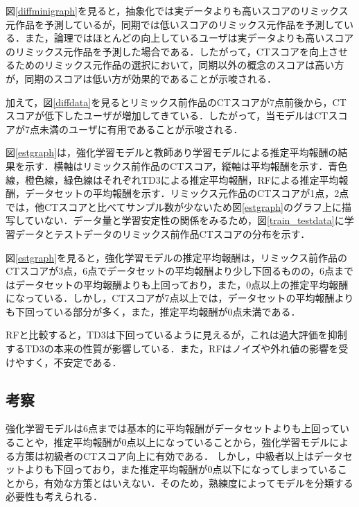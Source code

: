 \documentclass[submit,techrep,noauthor]{ipsj}
\begin{document}
図\ref{diffminigraph}を見ると，抽象化では実データよりも高いスコアのリミックス元作品を予測しているが，同期では低いスコアのリミックス元作品を予測している．また，論理ではほとんどの向上しているユーザは実データよりも高いスコアのリミックス元作品を予測した場合である．したがって，CTスコアを向上させるためのリミックス元作品の選択において，同期以外の概念のスコアは高い方が，同期のスコアは低い方が効果的であることが示唆される．

加えて，図\ref{diffdata}を見るとリミックス前作品のCTスコアが7点前後から，CTスコアが低下したユーザが増加してきている．したがって，当モデルはCTスコアが7点未満のユーザに有用であることが示唆される．

図\ref{estgraph}は，強化学習モデルと教師あり学習モデルによる推定平均報酬の結果を示す．横軸はリミックス前作品のCTスコア，縦軸は平均報酬を示す．青色線，橙色線，緑色線はそれぞれTD3による推定平均報酬，RFによる推定平均報酬，データセットの平均報酬を示す．リミックス元作品のCTスコアが1点，2点では，他CTスコアと比べてサンプル数が少ないため図\ref{estgraph}のグラフ上に描写していない．データ量と学習安定性の関係をみるため，図\ref{train_testdata}に学習データとテストデータのリミックス前作品CTスコアの分布を示す．


図\ref{estgraph}を見ると，強化学習モデルの推定平均報酬は，リミックス前作品のCTスコアが3点，6点でデータセットの平均報酬より少し下回るものの，6点まではデータセットの平均報酬よりも上回っており，また，0点以上の推定平均報酬になっている．しかし，CTスコアが7点以上では，データセットの平均報酬よりも下回っている部分が多く，また，推定平均報酬が0点未満である．

RFと比較すると，TD3は下回っているように見えるが，これは過大評価を抑制するTD3の本来の性質が影響している．また，RFはノイズや外れ値の影響を受けやすく，不安定である．

\subsection{考察}
強化学習モデルは6点までは基本的に平均報酬がデータセットよりも上回っていることや，推定平均報酬が0点以上になっていることから，強化学習モデルによる方策は初級者のCTスコア向上に有効である．
しかし，中級者以上はデータセットよりも下回っており，また推定平均報酬が0点以下になってしまっていることから，有効な方策とはいえない．そのため，熟練度によってモデルを分類する必要性も考えられる．
\end{document}
